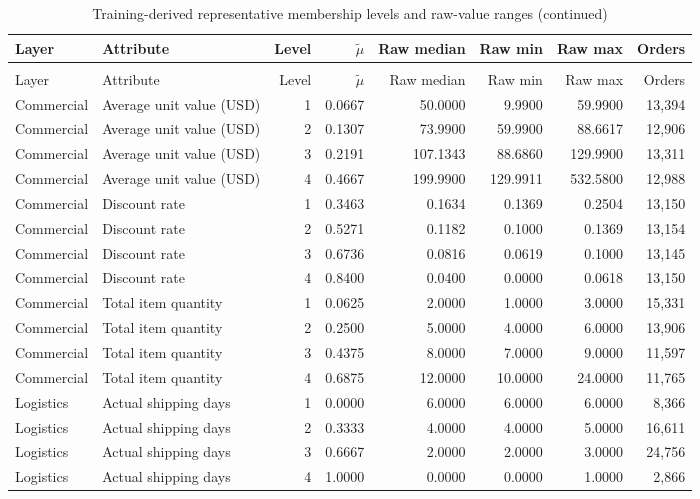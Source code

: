 \begingroup\small\setlength{\tabcolsep}{3pt}
\begin{longtable}{@{}llrrrrrr@{}}
\caption{Training-derived representative membership levels and raw-value ranges}\label{tab:s4}\\
\toprule
Layer & Attribute & Level & $\widetilde\mu$ & Raw median & Raw min & Raw max & Orders\\
\midrule
\endfirsthead
\caption[]{Training-derived representative membership levels and raw-value ranges (continued)}\\
\toprule
Layer & Attribute & Level & $\widetilde\mu$ & Raw median & Raw min & Raw max & Orders\\
\midrule
\endhead
Commercial & Average unit value (USD) & 1 & 0.0667 & 50.0000 & 9.9900 & 59.9900 & 13,394\\
Commercial & Average unit value (USD) & 2 & 0.1307 & 73.9900 & 59.9900 & 88.6617 & 12,906\\
Commercial & Average unit value (USD) & 3 & 0.2191 & 107.1343 & 88.6860 & 129.9900 & 13,311\\
Commercial & Average unit value (USD) & 4 & 0.4667 & 199.9900 & 129.9911 & 532.5800 & 12,988\\
Commercial & Discount rate & 1 & 0.3463 & 0.1634 & 0.1369 & 0.2504 & 13,150\\
Commercial & Discount rate & 2 & 0.5271 & 0.1182 & 0.1000 & 0.1369 & 13,154\\
Commercial & Discount rate & 3 & 0.6736 & 0.0816 & 0.0619 & 0.1000 & 13,145\\
Commercial & Discount rate & 4 & 0.8400 & 0.0400 & 0.0000 & 0.0618 & 13,150\\
Commercial & Total item quantity & 1 & 0.0625 & 2.0000 & 1.0000 & 3.0000 & 15,331\\
Commercial & Total item quantity & 2 & 0.2500 & 5.0000 & 4.0000 & 6.0000 & 13,906\\
Commercial & Total item quantity & 3 & 0.4375 & 8.0000 & 7.0000 & 9.0000 & 11,597\\
Commercial & Total item quantity & 4 & 0.6875 & 12.0000 & 10.0000 & 24.0000 & 11,765\\
Logistics & Actual shipping days & 1 & 0.0000 & 6.0000 & 6.0000 & 6.0000 & 8,366\\
Logistics & Actual shipping days & 2 & 0.3333 & 4.0000 & 4.0000 & 5.0000 & 16,611\\
Logistics & Actual shipping days & 3 & 0.6667 & 2.0000 & 2.0000 & 3.0000 & 24,756\\
Logistics & Actual shipping days & 4 & 1.0000 & 0.0000 & 0.0000 & 1.0000 & 2,866\\

\end{longtable}
